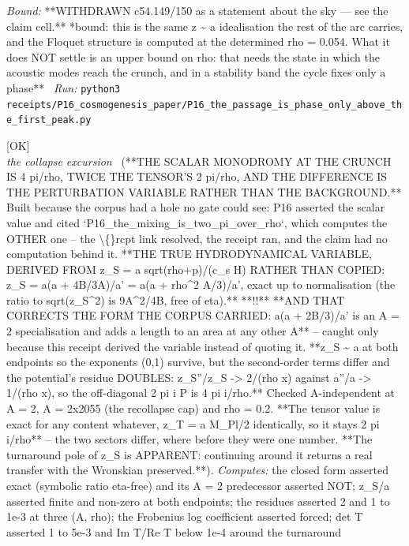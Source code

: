 \begin{description}
 \emph{Bound:} **WITHDRAWN c54.149/150 as a statement about the sky --- see the claim cell.** *bound: this is the same z \textasciitilde{} a idealisation the rest of the arc carries, and the Floquet structure is computed at the determined rho = 0.054. What it does NOT settle is an upper bound on rho: that needs the state in which the acoustic modes reach the crunch, and in a stability band the cycle fixes only a phase**
\ \emph{Run:} \texttt{python3 receipts/P16\_cosmogenesis\_paper/P16\_the\_passage\_is\_phase\_only\_above\_the\_first\_peak.py}
\item[\rcptlabel{P16_the_scalar_monodromy_is_four_pi_over_rho}{P16R24}\textbf{P16R24}\quad\texttt{P16\_the\_scalar\_monodromy\_is\_four\_pi\_over\_rho}]\hfill\textsf{[OK]}\\
\textit{the collapse excursion} \ (**THE SCALAR MONODROMY AT THE CRUNCH IS 4 pi/rho, TWICE THE TENSOR'S 2 pi/rho, AND THE DIFFERENCE IS THE PERTURBATION VARIABLE RATHER THAN THE BACKGROUND.** Built because the corpus had a hole no gate could see: P16 asserted the scalar value and cited `P16\_the\_mixing\_is\_two\_pi\_over\_rho`, which computes the OTHER one -- the \textbackslash\{\}rcpt link resolved, the receipt ran, and the claim had no computation behind it. **THE TRUE HYDRODYNAMICAL VARIABLE, DERIVED FROM z\_S = a sqrt(rho+p)/(c\_s H) RATHER THAN COPIED: z\_S = a(a + 4B/3A)/a' = a(a + rho\textasciicircum{}2 A/3)/a', exact up to normalisation (the ratio to sqrt(z\_S\textasciicircum{}2) is 9A\textasciicircum{}2/4B, free of eta).** **!!** **AND THAT CORRECTS THE FORM THE CORPUS CARRIED: a(a + 2B/3)/a' is an A = 2 specialisation and adds a length to an area at any other A** -- caught only because this receipt derived the variable instead of quoting it. **z\_S \textasciitilde{} a at both endpoints so the exponents (0,1) survive, but the second-order terms differ and the potential's residue DOUBLES: z\_S''/z\_S -> 2/(rho x) against a''/a -> 1/(rho x), so the off-diagonal 2 pi i P is 4 pi i/rho.** Checked A-independent at A = 2, A = 2x2055 (the recollapse cap) and rho = 0.2. **The tensor value is exact for any content whatever, z\_T = a M\_Pl/2 identically, so it stays 2 pi i/rho** -- the two sectors differ, where before they were one number. **The turnaround pole of z\_S is APPARENT: continuing around it returns a real transfer with the Wronskian preserved.**). 
\emph{Computes:} the closed form asserted exact (symbolic ratio eta-free) and its A = 2 predecessor asserted NOT; z\_S/a asserted finite and non-zero at both endpoints; the residues asserted 2 and 1 to 1e-3 at three (A, rho); the Frobenius log coefficient asserted forced; det T asserted 1 to 5e-3 and \textbar{}Im T\textbar{}/\textbar{}Re T\textbar{} below 1e-4 around the turnaround

\end{description}
